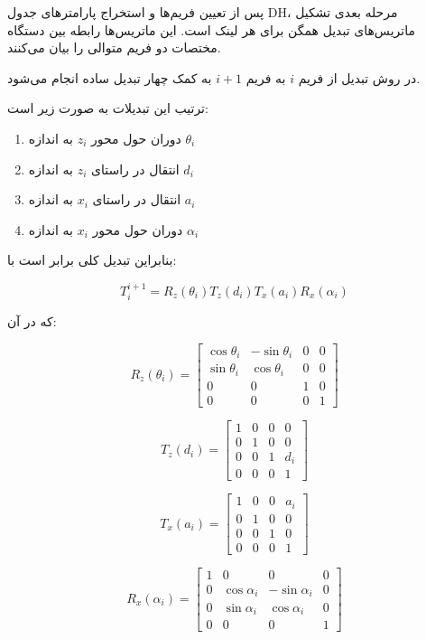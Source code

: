 \documentclass{article}
\begin{document}
پس از تعیین فریم‌ها و استخراج پارامترهای جدول DH، مرحله بعدی تشکیل
ماتریس‌های تبدیل همگن برای هر لینک است. این ماتریس‌ها رابطه بین دستگاه
مختصات دو فریم متوالی را بیان می‌کنند.

در روش  تبدیل از فریم $i$ به فریم $i+1$ به کمک
چهار تبدیل ساده انجام می‌شود.

ترتیب این تبدیلات به صورت زیر است:

\begin{enumerate}
	\item دوران حول محور $z_i$ به اندازه $\theta_i$
	\item انتقال در راستای $z_i$ به اندازه $d_i$
	\item انتقال در راستای $x_i$ به اندازه $a_i$
	\item دوران حول محور $x_i$ به اندازه $\alpha_i$
\end{enumerate}

بنابراین تبدیل کلی برابر است با:

\[
T_i^{i+1} =
R_z(\theta_i)
T_z(d_i)
T_x(a_i)
R_x(\alpha_i)
\]

که در آن:

\[
R_z(\theta_i)=
\begin{bmatrix}
	\cos\theta_i & -\sin\theta_i & 0 & 0\\
	\sin\theta_i & \cos\theta_i & 0 & 0\\
	0 & 0 & 1 & 0\\
	0 & 0 & 0 & 1
\end{bmatrix}
\]

\[
T_z(d_i)=
\begin{bmatrix}
	1 & 0 & 0 & 0\\
	0 & 1 & 0 & 0\\
	0 & 0 & 1 & d_i\\
	0 & 0 & 0 & 1
\end{bmatrix}
\]

\[
T_x(a_i)=
\begin{bmatrix}
	1 & 0 & 0 & a_i\\
	0 & 1 & 0 & 0\\
	0 & 0 & 1 & 0\\
	0 & 0 & 0 & 1
\end{bmatrix}
\]

\[
R_x(\alpha_i)=
\begin{bmatrix}
	1 & 0 & 0 & 0\\
	0 & \cos\alpha_i & -\sin\alpha_i & 0\\
	0 & \sin\alpha_i & \cos\alpha_i & 0\\
	0 & 0 & 0 & 1
\end{bmatrix}
\]
\end{document}
